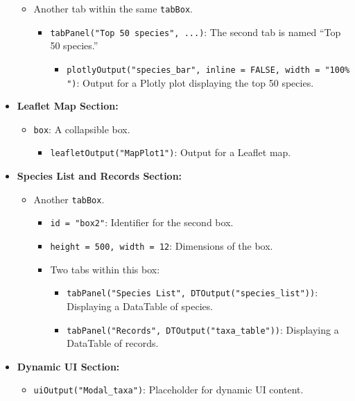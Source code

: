 \documentclass[
]{book}
\providecommand{\tightlist}{%
  \setlength{\itemsep}{0pt}\setlength{\parskip}{0pt}}
\begin{document}
\begin{itemize}
  \begin{itemize}
  \tightlist
  \item
    Another tab within the same \texttt{tabBox}.

    \begin{itemize}
    \tightlist
    \item
      \texttt{tabPanel("Top\ 50\ species",\ ...)}: The second tab is named ``Top 50 species.''

      \begin{itemize}
      \tightlist
      \item
        \texttt{plotlyOutput("species\_bar",\ inline\ =\ FALSE,\ width\ =\ "100\%")}: Output for a Plotly plot displaying the top 50 species.
      \end{itemize}
    \end{itemize}
  \end{itemize}
\item
  \textbf{Leaflet Map Section:}

  \begin{itemize}
  \tightlist
  \item
    \texttt{box}: A collapsible box.

    \begin{itemize}
    \tightlist
    \item
      \texttt{leafletOutput("MapPlot1")}: Output for a Leaflet map.
    \end{itemize}
  \end{itemize}
\item
  \textbf{Species List and Records Section:}

  \begin{itemize}
  \tightlist
  \item
    Another \texttt{tabBox}.

    \begin{itemize}
    \tightlist
    \item
      \texttt{id\ =\ "box2"}: Identifier for the second box.
    \item
      \texttt{height\ =\ 500,\ width\ =\ 12}: Dimensions of the box.
    \item
      Two tabs within this box:

      \begin{itemize}
      \tightlist
      \item
        \texttt{tabPanel("Species\ List",\ DTOutput("species\_list"))}: Displaying a DataTable of species.
      \item
        \texttt{tabPanel("Records",\ DTOutput("taxa\_table"))}: Displaying a DataTable of records.
      \end{itemize}
    \end{itemize}
  \end{itemize}
\item
  \textbf{Dynamic UI Section:}

  \begin{itemize}
  \tightlist
  \item
    \texttt{uiOutput("Modal\_taxa")}: Placeholder for dynamic UI content.
  \end{itemize}
\end{itemize}
\end{document}
